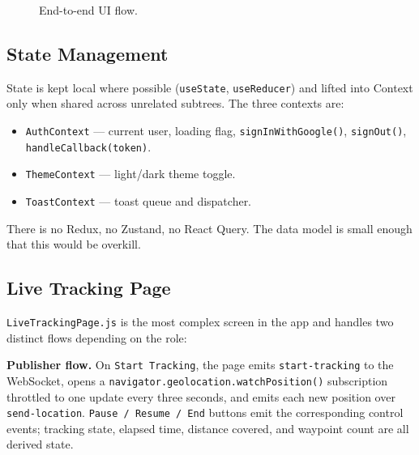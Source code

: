 \documentclass[11pt,a4paper]{article}
\begin{document}
\begin{figure}[h]
\centering
{}
\caption{End-to-end UI flow.}
\label{fig:ui-flow}
\end{figure}

\subsection{State Management}
State is kept local where possible (\texttt{useState},
\texttt{useReducer}) and lifted into Context only when shared across
unrelated subtrees.  The three contexts are:

\begin{itemize}[leftmargin=*]
  \item \texttt{AuthContext} — current user, loading flag,
        \texttt{signInWithGoogle()}, \texttt{signOut()},
        \texttt{handleCallback(token)}.
  \item \texttt{ThemeContext} — light/dark theme toggle.
  \item \texttt{ToastContext} — toast queue and dispatcher.
\end{itemize}

There is no Redux, no Zustand, no React Query.  The data model is
small enough that this would be overkill.

\subsection{Live Tracking Page}
\texttt{LiveTrackingPage.js} is the most complex screen in the app and
handles two distinct flows depending on the role:

\textbf{Publisher flow.}  On \texttt{Start Tracking}, the page emits
\texttt{start-tracking} to the WebSocket, opens a
\texttt{navigator.geolocation.watchPosition()} subscription throttled
to one update every three seconds, and emits each new position over
\texttt{send-location}.  \texttt{Pause / Resume / End} buttons emit
the corresponding control events; tracking state, elapsed time,
distance covered, and waypoint count are all derived state.
\end{document}
